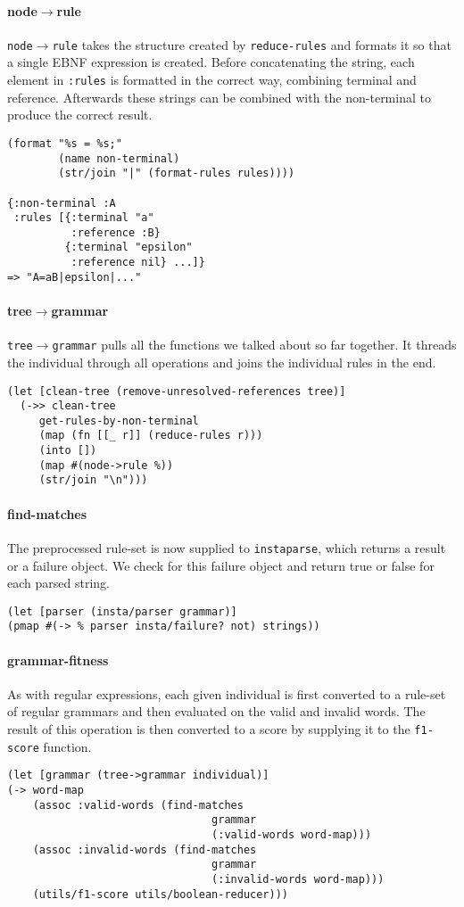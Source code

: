 \documentclass[runningheads]{llncs}
\begin{document}
\paragraph{node$\rightarrow$rule}
\texttt{node$\rightarrow$rule} takes the structure created by \texttt{reduce-rules} and formats it so that a single EBNF expression is created. Before concatenating the string, each element in \texttt{:rules} is formatted in the correct way, combining terminal and reference. Afterwards these strings can be combined with the non-terminal to produce the correct result.
\begin{lstlisting}
(format "%s = %s;"
        (name non-terminal)
        (str/join "|" (format-rules rules))))

{:non-terminal :A
 :rules [{:terminal "a"
          :reference :B}
         {:terminal "epsilon"
          :reference nil} ...]}
=> "A=aB|epsilon|..."
\end{lstlisting}

\paragraph{tree$\rightarrow$grammar}
\texttt{tree$\rightarrow$grammar} pulls all the functions we talked about so far together. It threads the individual through all operations and joins the individual rules in the end.
\begin{lstlisting}
(let [clean-tree (remove-unresolved-references tree)]
  (->> clean-tree
     get-rules-by-non-terminal
     (map (fn [[_ r]] (reduce-rules r)))
     (into [])
     (map #(node->rule %))
     (str/join "\n")))
\end{lstlisting}

\paragraph{find-matches}
The preprocessed rule-set is now supplied to \texttt{instaparse}, which returns a result or a failure object. We check for this failure object and return true or false for each parsed string.
\begin{lstlisting}
(let [parser (insta/parser grammar)]
(pmap #(-> % parser insta/failure? not) strings))
\end{lstlisting}

\paragraph{grammar-fitness}
As with regular expressions, each given individual is first converted to a rule-set of regular grammars and then evaluated on the valid and invalid words. The result of this operation is then converted to a score by supplying it to the \texttt{f1-score} function.
\begin{lstlisting}
(let [grammar (tree->grammar individual)]
(-> word-map
    (assoc :valid-words (find-matches
                                grammar
                                (:valid-words word-map)))
    (assoc :invalid-words (find-matches
                                grammar
                                (:invalid-words word-map)))
    (utils/f1-score utils/boolean-reducer)))
\end{lstlisting}
\end{document}
